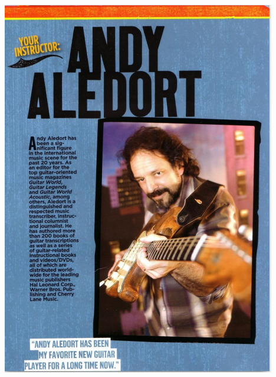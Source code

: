 \documentclass[a4paper]{book}
\begin{document}
\begin{center}
\includegraphics[width=11.957cm,height=16.455cm]{lebluessupportsmethodes-img99.png}
\end{center}









\clearpage
\end{document}
